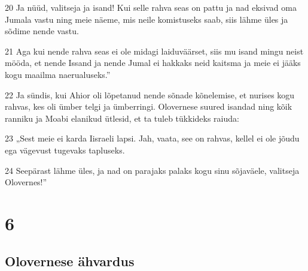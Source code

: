 \par 20 Ja nüüd, valitseja ja isand! Kui selle rahva seas on pattu ja nad eksivad oma Jumala vastu ning meie näeme, mis neile komistuseks saab, siis lähme üles ja sõdime nende vastu.
\par 21 Aga kui nende rahva seas ei ole midagi laiduväärset, siis mu isand mingu neist mööda, et nende Issand ja nende Jumal ei hakkaks neid kaitsma ja meie ei jääks kogu maailma naerualuseks.”
\par 22 Ja sündis, kui Ahior oli lõpetanud nende sõnade kõnelemise, et nurises kogu rahvas, kes oli ümber telgi ja ümberringi. Olovernese suured isandad ning kõik ranniku ja Moabi elanikud ütlesid, et ta tuleb tükkideks raiuda:
\par 23 „Sest meie ei karda Iisraeli lapsi. Jah, vaata, see on rahvas, kellel ei ole jõudu ega vägevust tugevaks tapluseks.
\par 24 Seepärast lähme üles, ja nad on parajaks palaks kogu sinu sõjaväele, valitseja Olovernes!”


\chapter{6}

\section*{Olovernese ähvardus}

